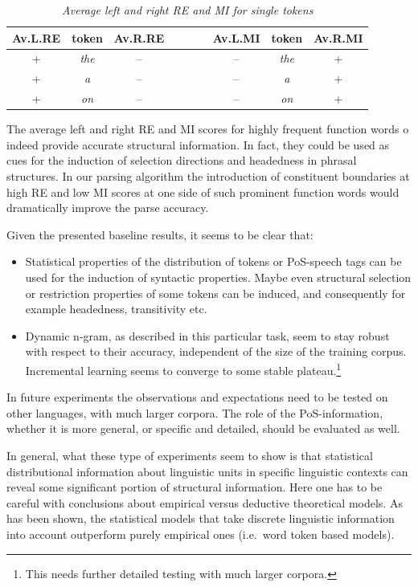 \documentclass[11pt,a4paper,english]{article}
\begin{document}
\begin{table}[H]
\centering
  \begin{tabular}{ccccccc}
  \textbf{Av.L.RE} & \textbf{token} & \textbf{Av.R.RE} & ~~~~ & \textbf{Av.L.MI} & \textbf{token} & \textbf{Av.R.MI} \\\hline
  +              & \textit{the}   & -- & & -- & \textit{the} & + \\
  +              & \textit{a}   & -- & & -- & \textit{a} & + \\
  +              & \textit{on}   & -- & & -- & \textit{on} & + \\
  \end{tabular}
  \caption{\emph{Average left and right RE and MI for single tokens}\label{Tbl:AVREMI}}
\end{table}

The average left and right RE and MI scores for highly frequent function words o indeed provide accurate structural information. In fact, they could be used as cues for the induction of selection directions and headedness in phrasal structures. In our parsing algorithm the introduction of constituent boundaries at high RE and low MI scores at one side of such prominent function words would dramatically improve the parse accuracy.

Given the presented baseline results, it seems to be clear that:

\begin{itemize}
\item Statistical properties of the distribution of tokens or PoS-speech tags can be used for the induction of syntactic properties. Maybe even structural selection or restriction properties of some tokens can be induced, and consequently for example headedness, transitivity etc.

\item Dynamic n-gram, as described in this particular task, seem to stay robust with respect to their accuracy, independent of the size of the training corpus. Incremental learning seems to converge to some stable plateau.\footnote{This needs further detailed testing with much larger corpora.}
\end{itemize}

In future experiments the observations and expectations need to be tested on other languages, with much larger corpora. The role of the PoS-information, whether it is more general, or specific and detailed, should be evaluated as well.

In general, what these type of experiments seem to show is that statistical distributional information about linguistic units in specific linguistic contexts can reveal some significant portion of structural information. Here one has to be careful with conclusions about empirical versus deductive theoretical models. As has been shown, the statistical models that take discrete linguistic information into account outperform purely empirical ones (i.e.\ word token based models).
\end{document}
